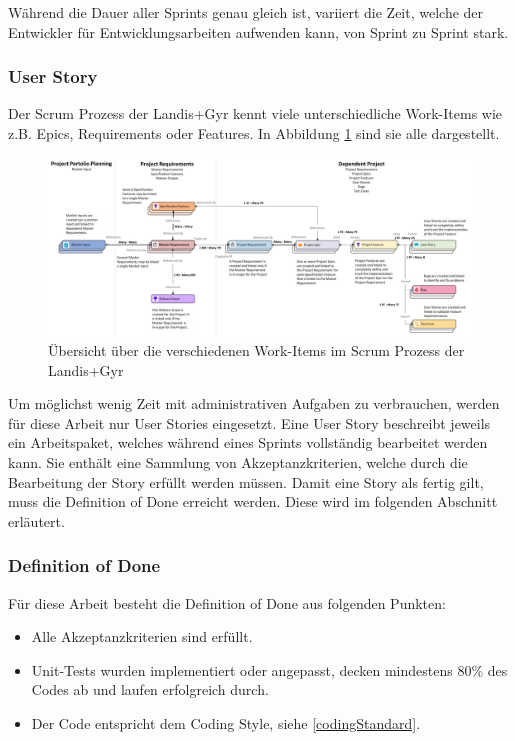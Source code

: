 Während die Dauer aller Sprints genau gleich ist, variiert die Zeit, welche der Entwickler für Entwicklungsarbeiten aufwenden kann, von Sprint zu Sprint stark.

\subsubsection{User Story}\label{userstory}
Der Scrum Prozess der Landis+Gyr kennt viele unterschiedliche Work-Items wie z.B. Epics, Requirements oder Features.
In Abbildung \ref{fig:workitems} sind sie alle dargestellt.
\begin{figure}[H]
   \centering
   \includegraphics[width=1.0\textwidth]{gfx/WorkItemRelationsship.png}
   \caption{
      Übersicht über die verschiedenen Work-Items im Scrum Prozess der Landis+Gyr
      }
      \label{fig:workitems}
\end{figure}
Um möglichst wenig Zeit mit administrativen Aufgaben zu verbrauchen, werden für diese Arbeit nur User Stories eingesetzt.
Eine User Story beschreibt jeweils ein Arbeitspaket, welches während eines Sprints vollständig bearbeitet werden kann.
Sie enthält eine Sammlung von Akzeptanzkriterien, welche durch die Bearbeitung der Story erfüllt werden müssen.
Damit eine Story als fertig gilt, muss die Definition of Done erreicht werden. Diese wird im folgenden Abschnitt erläutert.


\subsubsection{Definition of Done}
Für diese Arbeit besteht die Definition of Done aus folgenden Punkten:
\begin{itemize}
   \item Alle Akzeptanzkriterien sind erfüllt.
   \item Unit-Tests wurden implementiert oder angepasst, decken mindestens 80\% des Codes ab und laufen erfolgreich durch.
   \item Der Code entspricht dem Coding Style, siehe \ref{codingStandard}.
\end{itemize}

